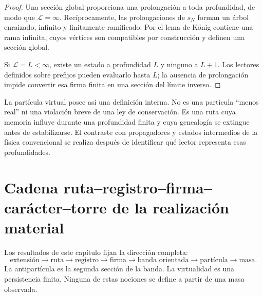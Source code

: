 \begin{proof}
Una sección global proporciona una prolongación a toda profundidad, de modo
que \(\mathcal L=\infty\). Recíprocamente, las prolongaciones de \(s_N\)
forman un árbol enraizado, infinito y finitamente ramificado. Por el lema de
Kőnig contiene una rama infinita, cuyos vértices son compatibles por
construcción y definen una sección global.

Si \(\mathcal L=L<\infty\), existe un estado a profundidad \(L\) y ninguno
a \(L+1\). Los lectores definidos sobre prefijos pueden evaluarlo hasta
\(L\); la ausencia de prolongación impide convertir esa firma finita en una
sección del límite inverso.
\end{proof}

La partícula virtual posee así una definición interna. No es una partícula
``menos real'' ni una violación breve de una ley de conservación. Es una
ruta cuya memoria influye durante una profundidad finita y cuya genealogía
se extingue antes de estabilizarse. El contraste con propagadores y estados
intermedios de la física convencional se realiza después de identificar qué
lector representa esas profundidades.

\section{Cadena ruta–registro–firma–carácter–torre de la realización material}

Los resultados de este capítulo fijan la dirección completa:
\[
\boxed{
\text{extensión}\to
\text{ruta}\to
\text{registro}\to
\text{firma}\to
\text{banda orientada}\to
\text{partícula}\to
\text{masa}.}
\]
La antipartícula es la segunda sección de la banda. La virtualidad es una
persistencia finita. Ninguna de estas nociones se define a partir de una
masa observada.
